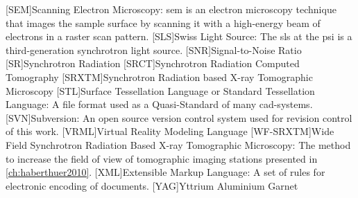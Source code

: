 \begin{acronym}[WF-SRXTM]
		[SEM]{Scanning Electron Microscopy}: \acs{sem} is an electron microscopy technique that images the sample surface by scanning it with a high-energy beam of electrons in a raster scan pattern.
		[SLS]{Swiss Light Source}: The \acs{sls} at the \acs{psi} is a third-generation synchrotron light source.
		[SNR]{Signal-to-Noise Ratio}
		[SR]{Synchrotron Radiation}
		{Synchrotron Radiation Computed Tomography}
		[SRXTM]{Synchrotron Radiation based X-ray Tomographic Microscopy}
		[STL]{Surface Tessellation Language or Standard Tessellation Language}: A file format used as a Quasi-Standard of many \acs{cad}-systems.
		[SVN]{Subversion}: An open source version control system used for revision control of this work.
		{Virtual Reality Modeling Language}
		[WF-SRXTM]{Wide Field Synchrotron Radiation Based X-ray Tomographic Microscopy}: The method to increase the field of view of tomographic imaging stations presented in \autoref{ch:haberthuer2010}.
		[XML]{Extensible Markup Language}: A set of rules for electronic encoding of documents.
		[YAG]{Yttrium Aluminium Garnet}
	\end{acronym}
\endgroup

\cleardoublepage